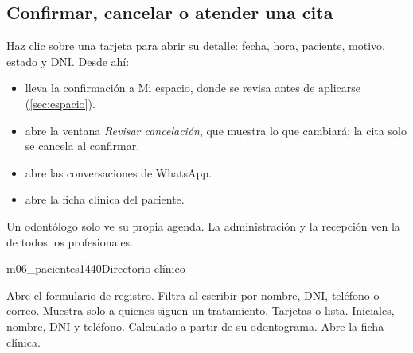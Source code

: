 \documentclass[11pt]{article}
\begin{document}
\subsection{Confirmar, cancelar o atender una cita}

Haz clic sobre una tarjeta para abrir su detalle: fecha, hora, paciente, motivo, estado y DNI. Desde ahí:

\begin{itemize}
  \item {} lleva la confirmación a Mi espacio, donde se revisa antes de aplicarse (\cref{sec:espacio}).
  \item {} abre la ventana \textit{Revisar cancelación}, que muestra lo que cambiará; la cita solo se cancela al confirmar.
  \item {} abre las conversaciones de WhatsApp.
  \item {} abre la ficha clínica del paciente.
\end{itemize}

\begin{sdpermiso}
Un odontólogo solo ve su propia agenda. La administración y la recepción ven la de todos los profesionales.
\end{sdpermiso}

\label{sec:pacientes}


\begin{pantalla}{m06_pacientes}{1440}{Directorio clínico}
\end{pantalla}

\begin{leyenda}
   Abre el formulario de registro.
   Filtra al escribir por nombre, DNI, teléfono o correo.
   Muestra solo a quienes siguen un tratamiento.
   Tarjetas o lista.
   Iniciales, nombre, DNI y teléfono.
   Calculado a partir de su odontograma.
   Abre la ficha clínica.
\end{leyenda}
\end{document}
